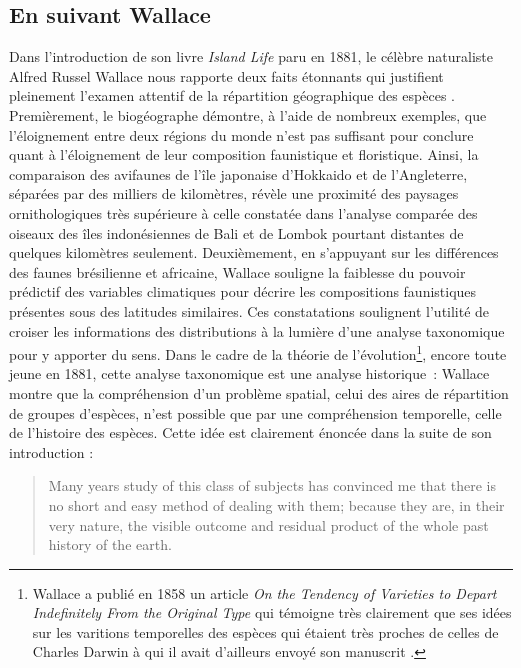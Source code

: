 \subsection*{En suivant Wallace}\label{en-suivant-wallace}

Dans l'introduction de son livre \emph{Island Life} paru en 1881, le
célèbre naturaliste Alfred Russel Wallace nous rapporte deux faits
étonnants qui justifient pleinement l'examen attentif de la répartition
géographique des espèces \citep{wallace1881island}. Premièrement, le
biogéographe démontre, à l'aide de nombreux exemples, que l'éloignement
entre deux régions du monde n'est pas suffisant pour conclure quant à
l'éloignement de leur composition faunistique et floristique. Ainsi, la
comparaison des avifaunes de l'île japonaise d'Hokkaido et de
l'Angleterre, séparées par des milliers de kilomètres, révèle une
proximité des paysages ornithologiques très supérieure à celle constatée
dans l'analyse comparée des oiseaux des îles indonésiennes de Bali et de
Lombok pourtant distantes de quelques kilomètres seulement.
Deuxièmement, en s'appuyant sur les différences des faunes brésilienne
et africaine, Wallace souligne la faiblesse du pouvoir prédictif des
variables climatiques pour décrire les compositions faunistiques
présentes sous des latitudes similaires. Ces constatations soulignent
l'utilité de croiser les informations des distributions à la lumière
d'une analyse taxonomique pour y apporter du sens. Dans le cadre de la
théorie de l'évolution\footnote{Wallace a publié en 1858 un article
  \emph{On the Tendency of Varieties to Depart Indefinitely From the
  Original Type} qui témoigne très clairement que ses idées sur les
  varitions temporelles des espèces qui étaient très proches de celles
  de Charles Darwin à qui il avait d'ailleurs envoyé son manuscrit
  \citep{Wallace1858}.}, encore toute jeune en 1881, cette analyse
taxonomique est une analyse historique~: Wallace montre que la
compréhension d'un problème spatial, celui des aires de répartition de
groupes d'espèces, n'est possible que par une compréhension temporelle,
celle de l'histoire des espèces. Cette idée est clairement énoncée dans
la suite de son introduction :

\begin{quote}
Many years study of this class of subjects has convinced me that there
is no short and easy method of dealing with them; because they are, in
their very nature, the visible outcome and residual product of the whole
past history of the earth.
\end{quote}

